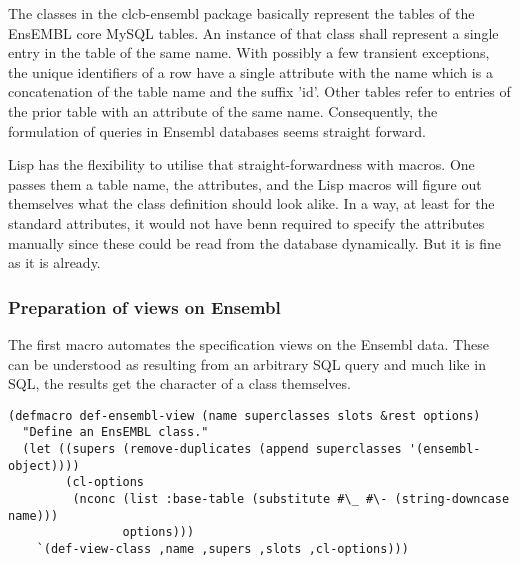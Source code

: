 \documentclass{book}
\newcommand\ensembl{EnsEMBL }
\begin{document}
The classes in the clcb-ensembl package basically represent the tables of
the \ensembl core MySQL tables. An instance of that class shall represent 
a single entry in the table of the same name. With possibly a few transient
exceptions, the unique identifiers of a row have a single attribute with the 
name which is a concatenation of the table name and the suffix 'id'. Other
tables refer to entries of the prior table with an attribute of the same name.
Consequently, the formulation of queries in Ensembl databases seems straight
forward.

Lisp has the flexibility to utilise that straight-forwardness with
macros. One passes them a table name, the attributes, and the Lisp macros
will figure out themselves what the class definition should look alike.
In a way, at least for the standard attributes, it would not have benn required to
specify the attributes manually since these could be read from the database dynamically.
But it is fine as it is already.

\subsubsection{Preparation of views on Ensembl}

The first macro automates the specification views on the Ensembl data. These
can be understood as resulting from an arbitrary SQL query and much like in 
SQL, the results get the character of a class themselves.

\begin{lstlisting}
(defmacro def-ensembl-view (name superclasses slots &rest options)
  "Define an EnsEMBL class."
  (let ((supers (remove-duplicates (append superclasses '(ensembl-object))))
        (cl-options
         (nconc (list :base-table (substitute #\_ #\- (string-downcase name)))
                options)))
    `(def-view-class ,name ,supers ,slots ,cl-options)))
\end{lstlisting}
\end{document}
